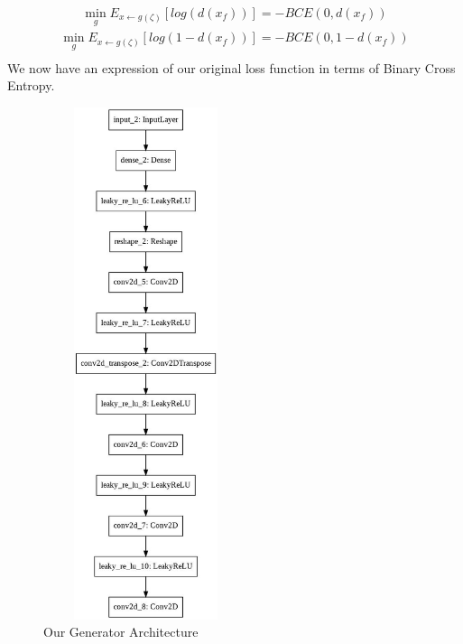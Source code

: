 \documentclass[conference]{IEEEtran}
\begin{document}
  \begin{align*}
    \min_g E_{x \leftarrow g(\zeta)}[log(d(x_{f}))] = -BCE(0, d(x_f)) 
\end{align*}
      \begin{align*}
    \min_g E_{x \leftarrow g(\zeta)}[log(1-d(x_{f}))] = -BCE(0, 1-d(x_f)) \\
\end{align*}
We now have an expression of our original loss function in terms of Binary Cross Entropy. 
\begin{figure}[h]
\includegraphics[width=6cm, height=15cm]{Gen.jpeg}
\caption{Our Generator Architecture}
\end{figure}
\end{document}
